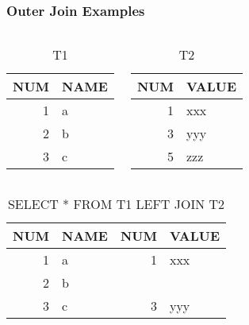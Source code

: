 \documentclass[dvipsnames]{beamer}
\theoremstyle{plain}
\begin{document}
\begin{frame}[fragile]
  \frametitle{Outer Join Examples}

  \begin{example}
    \begin{columns}[t]
      \begin{tiny}
      \begin{table}
        \caption{T1}
        \begin{tabular}{|r|l|}\hline
NUM & NAME \\\hline\hline
  1 & a    \\\hline
  2 & b    \\\hline
  3 & c    \\\hline
        \end{tabular}
      \end{table}
      \end{tiny}

      \begin{tiny}
      \begin{table}
        \caption{T2}
        \begin{tabular}{|r|l|}\hline
NUM & VALUE \\\hline\hline
  1 & xxx   \\\hline
  3 & yyy   \\\hline
  5 & zzz   \\\hline
        \end{tabular}
      \end{table}
      \end{tiny}
    \end{columns}

    \pause
    \begin{center}
      \begin{tiny}
      \begin{table}
        \caption{SELECT * FROM T1 LEFT JOIN T2}
        \begin{tabular}{|r|l|r|l|}\hline
NUM & NAME & NUM & VALUE \\\hline\hline
  1 & a    &   1 & xxx   \\\hline
  2 & b    &     &       \\\hline
  3 & c    &   3 & yyy   \\\hline
        \end{tabular}
      \end{table}
      \end{tiny}
    \end{center}
  \end{example}
\end{frame}
\end{document}
